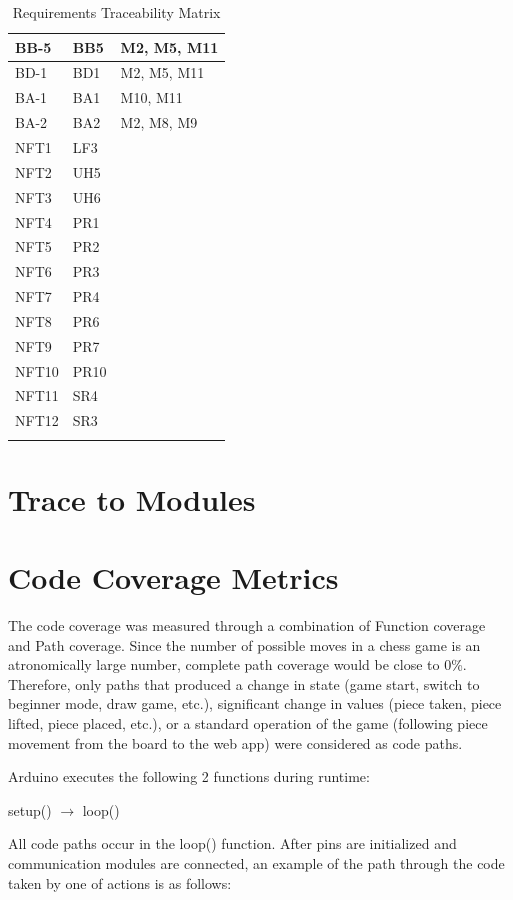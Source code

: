 \documentclass[12pt, titlepage]{article}
\begin{document}
\begin{longtable}{| p{} | p{} | p{}|}
  \hline
  BB-5 & BB5 & M2, M5, M11\\
  \hline
  BD-1 & BD1 &  M2, M5, M11\\
  \hline
  BA-1 & BA1 & M10, M11\\
  \hline
  BA-2 & BA2 & M2, M8, M9\\
  \hline
  NFT1 & LF3 &\\
  \hline
  NFT2 & UH5 &\\
  \hline
  NFT3 & UH6 &\\
  \hline
  NFT4 & PR1 &\\
  \hline
  NFT5 & PR2 &\\
  \hline
  NFT6 & PR3 &\\
  \hline
  NFT7 & PR4 &\\
  \hline
  NFT8 & PR6 &\\
  \hline
  NFT9 & PR7 &\\
  \hline
  NFT10 & PR10 &\\
  \hline
  NFT11 & SR4 &\\
  \hline
  NFT12 & SR3 &\\
  \hline
\caption{Requirements Traceability Matrix}
\end{longtable}
		
\section{Trace to Modules}		

\section{Code Coverage Metrics}

The code coverage was measured through a combination of Function coverage and Path coverage. Since the number of possible moves in a chess game is an 
atronomically large number, complete path coverage would be close to 0\%. Therefore, only paths that produced a change in state (game start, switch to beginner
mode, draw game, etc.), significant change in values (piece taken, piece lifted, piece placed, etc.), or a standard operation of the game (following piece movement
from the board to the web app) were considered as code paths.

Arduino executes the following 2 functions during runtime:

\begin{center}
  setup() $\rightarrow$ loop()
\end{center}

All code paths occur in the loop() function. After pins are initialized and communication modules are connected, an example of the path through the
code taken by one of actions is as follows:
\end{document}
